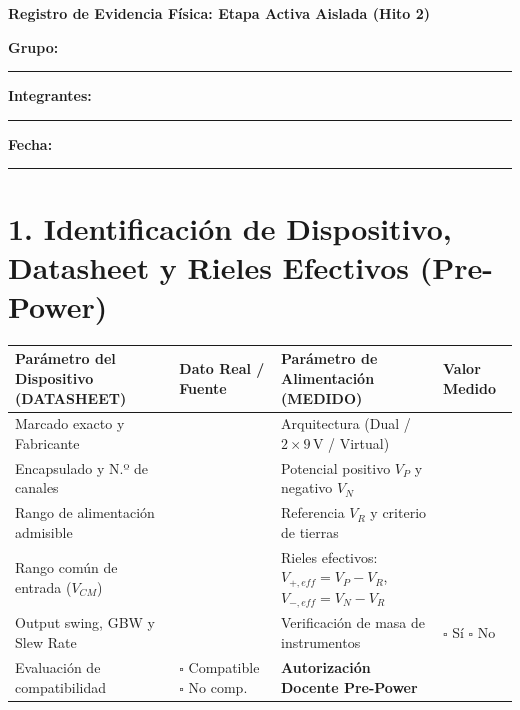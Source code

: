 \documentclass[10pt, a4paper]{article}
\begin{document}
\begin{center}
    \Large\textbf{\textcolor{ucbblue}{Registro de Evidencia Física: Etapa Activa Aislada (Hito 2)}}
\end{center}

\noindent\textbf{Grupo:} \rule{3cm}{0.4pt} \hfill \textbf{Integrantes:} \rule{7.5cm}{0.4pt} \hfill \textbf{Fecha:} \rule{2.5cm}{0.4pt}

\section*{1. Identificación de Dispositivo, Datasheet y Rieles Efectivos (Pre-Power)}
\begin{table}[htbp]
    \centering
    \footnotesize
    \renewcommand{\arraystretch}{1.35}
    \begin{tabularx}{\textwidth}{|>{\raggedright\arraybackslash}p{4.8cm}|>{\raggedright\arraybackslash}X|>{\raggedright\arraybackslash}p{4.5cm}|>{\raggedright\arraybackslash}X|}
    \hline
    \rowcolor[HTML]{EFEFEF} 
    \textbf{Parámetro del Dispositivo (DATASHEET)} & \textbf{Dato Real / Fuente} & \textbf{Parámetro de Alimentación (MEDIDO)} & \textbf{Valor Medido} \\ \hline
    Marcado exacto y Fabricante & & Arquitectura (Dual / $2\times 9\,\text{V}$ / Virtual) & \\ \hline
    Encapsulado y N.º de canales & & Potencial positivo $V_P$ y negativo $V_N$ & \\ \hline
    Rango de alimentación admisible & & Referencia $V_R$ y criterio de tierras & \\ \hline
    Rango común de entrada ($V_{CM}$) & & Rieles efectivos: $V_{+,eff}=V_P-V_R$, $V_{-,eff}=V_N-V_R$ & \\ \hline
    Output swing, GBW y Slew Rate & & Verificación de masa de instrumentos & $\square$ Sí \quad $\square$ No \\ \hline
    Evaluación de compatibilidad & $\square$ Compatible $\square$ No comp. & \textbf{Autorización Docente Pre-Power} & \\ \hline
    \end{tabularx}
\end{table}
\end{document}
